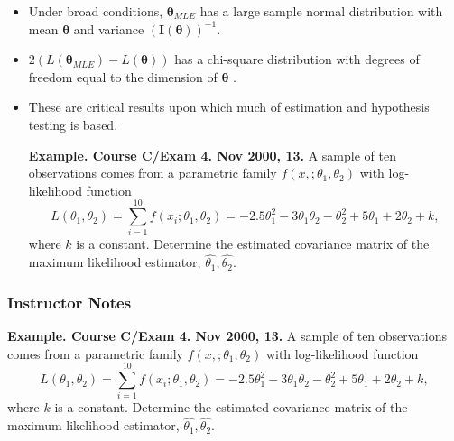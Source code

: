 \documentclass[]{book}
\theoremstyle{definition}
\theoremstyle{definition}
\theoremstyle{definition}
\theoremstyle{remark}
\begin{document}
\begin{itemize}
\item
  Under broad conditions, \(\boldsymbol \theta_{MLE}\) has a large
  sample normal distribution with mean \(\boldsymbol \theta\) and
  variance \(\left( \mathbf{I}(\boldsymbol \theta) \right)^{-1}\).
\item
  \(2 \left( L(\boldsymbol \theta_{MLE}) - L(\boldsymbol \theta) \right)\)
  has a chi-square distribution with degrees of freedom equal to the
  dimension of \(\boldsymbol \theta\) .
\item
  These are critical results upon which much of estimation and
  hypothesis testing is based.

  \textbf{Example. Course C/Exam 4. Nov 2000, 13.} A sample of ten
  observations comes from a parametric family
  \(f(x,; \theta_1, \theta_2)\) with log-likelihood function
  \[L(\theta_1, \theta_2)= \sum_{i=1}^{10} f(x_i; \theta_1, \theta_2) = -2.5 \theta_1^2 - 3
  \theta_1 \theta_2 - \theta_2^2 + 5 \theta_1 + 2 \theta_2 + k,\] where
  \(k\) is a constant. Determine the estimated covariance matrix of the
  maximum likelihood estimator, \(\hat{\theta_1}, \hat{\theta_2}\).
\end{itemize}

\subsubsection{Instructor Notes}\label{instructor-notes-1}

\textbf{Example. Course C/Exam 4. Nov 2000, 13.} A sample of ten
observations comes from a parametric family
\(f(x,; \theta_1, \theta_2)\) with log-likelihood function
\[L(\theta_1, \theta_2)= \sum_{i=1}^{10} f(x_i; \theta_1, \theta_2) = -2.5 \theta_1^2 - 3
\theta_1 \theta_2 - \theta_2^2 + 5 \theta_1 + 2 \theta_2 + k,\] where
\(k\) is a constant. Determine the estimated covariance matrix of the
maximum likelihood estimator, \(\hat{\theta_1}, \hat{\theta_2}\).
\end{document}
